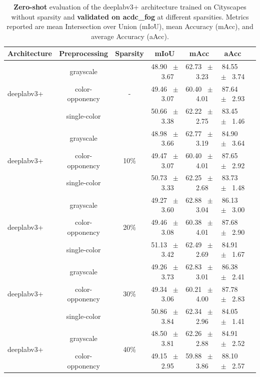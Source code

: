 \begin{table}[h]
  \centering
  \caption{\textbf{Zero-shot} evaluation of the deeplabv3+ architecture trained on Cityscapes without sparsity and \textbf{validated on acdc_fog} at different sparsities. Metrics reported are mean Intersection over Union (mIoU), mean Accuracy (mAcc), and average Accuracy (aAcc).}
  \begin{tabular}{@{}lccc ccc@{}}
    \toprule
    Architecture & Preprocessing & Sparsity & mIoU & mAcc & aAcc \\
    \midrule
    \multirow{3}{*}{deeplabv3+} & grayscale & \multirow{3}{*}{-} & 48.90 ~$\pm$~ 3.67 & 62.73 ~$\pm$~ 3.23 & 84.55 ~$\pm$~ 3.74 \\
    & color-opponency &  & 49.46 ~$\pm$~ 3.07 & 60.40 ~$\pm$~ 4.01 & 87.64 ~$\pm$~ 2.93 \\
    & single-color &  & 50.66 ~$\pm$~ 3.38 & 62.22 ~$\pm$~ 2.75 & 83.45 ~$\pm$~ 1.46 \\
    \midrule
    \multirow{3}{*}{deeplabv3+} & grayscale & \multirow{3}{*}{10\%} & 48.98 ~$\pm$~ 3.66 & 62.77 ~$\pm$~ 3.19 & 84.90 ~$\pm$~ 3.64 \\
    & color-opponency &  & 49.47 ~$\pm$~ 3.07 & 60.40 ~$\pm$~ 4.01 & 87.65 ~$\pm$~ 2.92 \\
    & single-color &  & 50.73 ~$\pm$~ 3.33 & 62.25 ~$\pm$~ 2.68 & 83.73 ~$\pm$~ 1.48 \\
    \midrule
    \multirow{3}{*}{deeplabv3+} & grayscale & \multirow{3}{*}{20\%} & 49.27 ~$\pm$~ 3.60 & 62.88 ~$\pm$~ 3.04 & 86.13 ~$\pm$~ 3.00 \\
    & color-opponency &  & 49.46 ~$\pm$~ 3.08 & 60.38 ~$\pm$~ 4.01 & 87.68 ~$\pm$~ 2.90 \\
    & single-color &  & 51.13 ~$\pm$~ 3.42 & 62.49 ~$\pm$~ 2.69 & 84.91 ~$\pm$~ 1.67 \\
    \midrule
    \multirow{3}{*}{deeplabv3+} & grayscale & \multirow{3}{*}{30\%} & 49.26 ~$\pm$~ 3.73 & 62.83 ~$\pm$~ 3.01 & 86.38 ~$\pm$~ 2.41 \\
    & color-opponency &  & 49.34 ~$\pm$~ 3.06 & 60.21 ~$\pm$~ 4.00 & 87.78 ~$\pm$~ 2.83 \\
    & single-color &  & 50.86 ~$\pm$~ 3.84 & 62.34 ~$\pm$~ 2.96 & 84.05 ~$\pm$~ 1.41 \\
    \midrule
    \multirow{3}{*}{deeplabv3+} & grayscale & \multirow{3}{*}{40\%} & 48.50 ~$\pm$~ 3.81 & 62.26 ~$\pm$~ 2.88 & 84.91 ~$\pm$~ 2.52 \\
    & color-opponency &  & 49.15 ~$\pm$~ 2.95 & 59.88 ~$\pm$~ 3.86 & 88.10 ~$\pm$~ 2.57 \\

\end{tabular}
\end{table}
